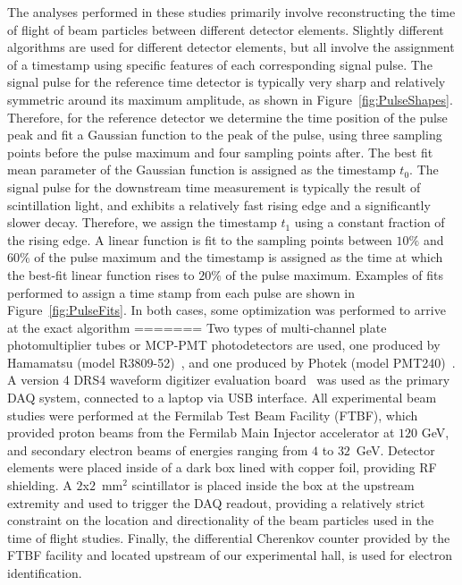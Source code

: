 \documentclass[12pt]{article}
\begin{document}
The analyses performed in these studies primarily involve
reconstructing the time of flight of beam particles
between different detector elements. Slightly different
algorithms are used for different detector elements,
but all involve the assignment of a timestamp using 
specific features of each corresponding signal pulse.
The signal pulse for the reference time detector
is typically very sharp and relatively symmetric 
around its maximum amplitude, as shown in 
Figure~\ref{fig:PulseShapes}. Therefore, for the reference 
detector we determine the time position of the pulse
peak and fit a Gaussian function to the peak
of the pulse, using three sampling points before the 
pulse maximum and four sampling points after. The
best fit mean parameter of the Gaussian function is
assigned as the timestamp $t_{0}$. The signal pulse
for the downstream time measurement is typically
the result of scintillation light, and exhibits a 
relatively fast rising edge and a significantly slower
decay. Therefore, we assign the timestamp $t_{1}$ 
using a constant fraction of the rising edge.
A linear function is fit to the sampling
points between $10\%$ and $60\%$ of the pulse maximum
and the timestamp is assigned as the time 
at which the best-fit linear function rises to $20\%$ of 
the pulse maximum. Examples of fits 
performed to assign a time stamp from each pulse are 
shown in Figure~\ref{fig:PulseFits}. In both cases, some 
optimization was performed to arrive at the exact algorithm 
=======
Two types of multi-channel plate photomultiplier tubes or MCP-PMT photodetectors
are used, one produced by Hamamatsu (model R3809-52)~\cite{HamamatsuMCP3809},
and one produced by Photek (model PMT240)~\cite{Photek240}. A version 4 DRS4
waveform digitizer evaluation board~\cite{DRS4} was used as the primary DAQ
system, connected to a laptop via USB interface. All experimental beam studies
were performed at the Fermilab Test Beam Facility (FTBF), which provided proton
beams from the Fermilab Main Injector accelerator at $120$ GeV, and secondary
electron beams of energies ranging from $4$ to $32$~GeV. Detector elements were
placed inside of a dark box lined with copper foil, providing RF shielding. A
$2$x$2$~$\mathrm{mm}^{2}$ scintillator is placed inside the box at the upstream
extremity and used to trigger the DAQ readout, providing a relatively strict
constraint on the location and directionality of the beam particles used in the
time of flight studies. Finally, the differential Cherenkov counter provided by
the FTBF facility and located upstream of our experimental hall, is used for
electron identification. 
\end{document}
